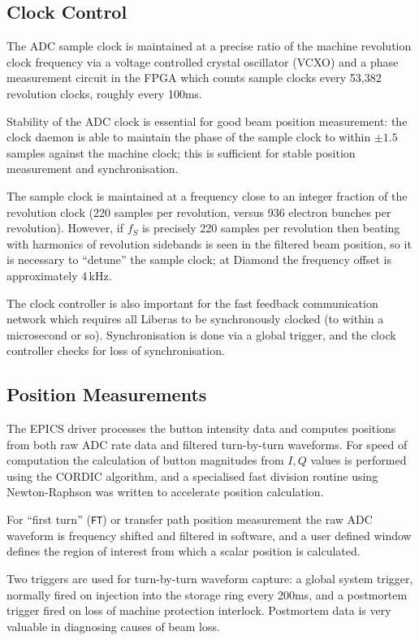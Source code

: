 \documentclass{JAC2003}
\begin{document}
\subsection{Clock Control}

The ADC sample clock is maintained at a precise ratio of the machine
revolution clock frequency via a voltage controlled crystal oscillator (VCXO)
and a phase measurement circuit in the FPGA which counts sample clocks every
53,382 revolution clocks, roughly every 100ms.

Stability of the ADC clock is essential for good beam position measurement:
the clock daemon is able to maintain the phase of the sample clock to within
$\pm 1.5$ samples against the machine clock; this is sufficient for stable
position measurement and synchronisation.

The sample clock is maintained at a frequency close to an integer fraction of
the revolution clock (220 samples per revolution, versus 936 electron bunches
per revolution).  However, if $f_S$ is precisely 220 samples per revolution
then beating with harmonics of revolution sidebands is seen in the filtered
beam position, so it is necessary to ``detune'' the sample clock; at Diamond
the frequency offset is approximately 4\,kHz.

The clock controller is also important for the fast feedback communication
network which requires all Liberas to be synchronously clocked (to within a
microsecond or so).  Synchronisation is done via a global trigger, and the
clock controller checks for loss of synchronisation.


\subsection{Position Measurements}

The EPICS driver processes the button intensity data and computes positions
from both raw ADC rate data and filtered turn-by-turn waveforms.  For speed of
computation the calculation of button magnitudes from $I,Q$ values is
performed using the CORDIC\cite{cordic} algorithm, and a specialised fast
division routine using Newton-Raphson was written to accelerate position
calculation.

For ``first turn'' (\texttt{FT}) or transfer path position measurement the raw
ADC waveform is frequency shifted and filtered in software, and a user
defined window defines the region of interest from which a scalar position is
calculated.

Two triggers are used for turn-by-turn waveform capture: a global system
trigger, normally fired on injection into the storage ring every 200ms, and a
postmortem trigger fired on loss of machine protection interlock.  Postmortem
data is very valuable in diagnosing causes of beam loss.
\end{document}

